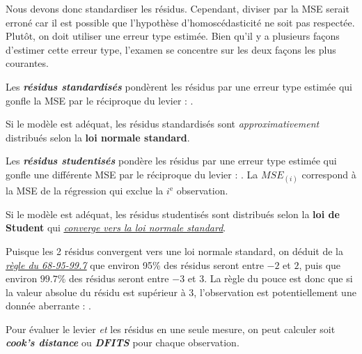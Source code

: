 \documentclass[french]{article}
\begin{document}
\begin{multicols*}{2}
\begin{rappel_enhanced}[Contexte]
\bigskip

Nous devons donc standardiser les résidus. Cependant, diviser par la MSE serait erroné car il est possible que l'hypothèse d'homoscédasticité ne soit pas respectée. Plutôt, on doit utiliser une erreur type estimée. Bien qu'il y a plusieurs façons d'estimer cette erreur type, l'examen se concentre sur les deux façons les plus courantes.
\end{rappel_enhanced}

\begin{definitionNOHFILLsub}
Les \textbf{\textit{résidus standardisés}} pondèrent les résidus par une erreur type estimée qui gonfle la MSE par le réciproque du levier : .

\bigskip

Si le modèle est adéquat, les résidus standardisés sont \textit{approximativement} distribués selon la \textbf{loi normale standard}.
\end{definitionNOHFILLsub}

\begin{definitionNOHFILLsub}
Les \textbf{\textit{résidus studentisés}} pondère les résidus par une erreur type estimée qui gonfle une différente MSE par le réciproque du levier : . La $MSE_{(i)}$ correspond à la MSE de la régression qui exclue la $i^{\text{e}}$ observation.

\bigskip

Si le modèle est adéquat, les résidus studentisés sont distribués selon la \textbf{loi de Student} qui \textit{\color{bleudefrance}\underline{\hyperlink{studentReminder}{\color{bleudefrance} converge vers la loi normale standard}}}.
\end{definitionNOHFILLsub}

Puisque les 2 résidus convergent vers une loi normale standard, on déduit de la \textit{\color{bleudefrance}\underline{\hyperlink{6895997Rule}{\color{bleudefrance} règle du 68-95-99.7}}} que environ 95\% des résidus seront entre $-2$ et $2$, puis que environ $99.7$\% des résidus seront entre $-3$ et $3$. La règle du pouce est donc que si la valeur absolue du résidu est supérieur à $3$, l'observation est potentiellement une donnée aberrante : .

\bigskip

\begin{rappel_enhanced}[Contexte]
Pour évaluer le levier \textit{et} les résidus en une seule mesure, on peut calculer soit \og \textit{\textbf{cook's distance}} \fg{} ou \textit{\textbf{DFITS}} pour chaque observation.
\end{rappel_enhanced}


\end{multicols*}
\end{document}
